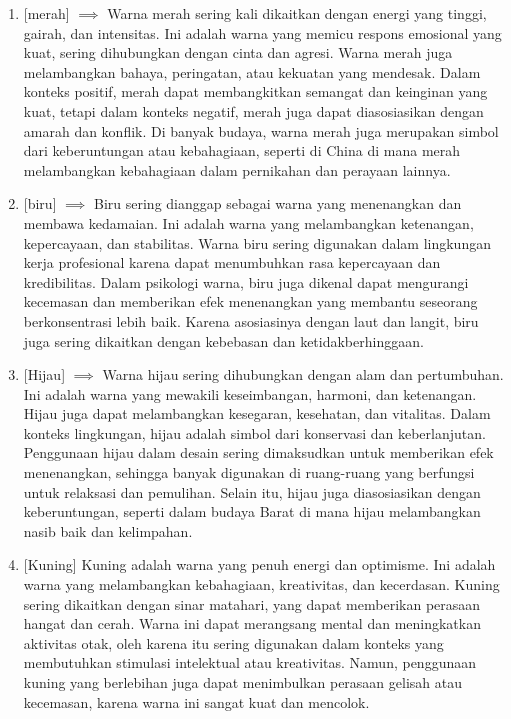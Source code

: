 \documentclass[a4paper]{article}
\begin{document}
\begin{enumerate}
  \item {}[merah] $\implies$ Warna merah sering kali dikaitkan dengan energi yang tinggi, gairah, dan intensitas. Ini adalah warna yang memicu respons emosional yang kuat, sering dihubungkan dengan cinta dan agresi. Warna merah juga melambangkan bahaya, peringatan, atau kekuatan yang mendesak. Dalam konteks positif, merah dapat membangkitkan semangat dan keinginan yang kuat, tetapi dalam konteks negatif, merah juga dapat diasosiasikan dengan amarah dan konflik. Di banyak budaya, warna merah juga merupakan simbol dari keberuntungan atau kebahagiaan, seperti di China di mana merah melambangkan kebahagiaan dalam pernikahan dan perayaan lainnya.
  \item {}[biru] $\implies$ Biru sering dianggap sebagai warna yang menenangkan dan membawa kedamaian. Ini adalah warna yang melambangkan ketenangan, kepercayaan, dan stabilitas. Warna biru sering digunakan dalam lingkungan kerja profesional karena dapat menumbuhkan rasa kepercayaan dan kredibilitas. Dalam psikologi warna, biru juga dikenal dapat mengurangi kecemasan dan memberikan efek menenangkan yang membantu seseorang berkonsentrasi lebih baik. Karena asosiasinya dengan laut dan langit, biru juga sering dikaitkan dengan kebebasan dan ketidakberhinggaan.
  \item {}[Hijau] $\implies$ Warna hijau sering dihubungkan dengan alam dan pertumbuhan. Ini adalah warna yang mewakili keseimbangan, harmoni, dan ketenangan. Hijau juga dapat melambangkan kesegaran, kesehatan, dan vitalitas. Dalam konteks lingkungan, hijau adalah simbol dari konservasi dan keberlanjutan. Penggunaan hijau dalam desain sering dimaksudkan untuk memberikan efek menenangkan, sehingga banyak digunakan di ruang-ruang yang berfungsi untuk relaksasi dan pemulihan. Selain itu, hijau juga diasosiasikan dengan keberuntungan, seperti dalam budaya Barat di mana hijau melambangkan nasib baik dan kelimpahan.
  \item {}[Kuning] Kuning adalah warna yang penuh energi dan optimisme. Ini adalah warna yang melambangkan kebahagiaan, kreativitas, dan kecerdasan. Kuning sering dikaitkan dengan sinar matahari, yang dapat memberikan perasaan hangat dan cerah. Warna ini dapat merangsang mental dan meningkatkan aktivitas otak, oleh karena itu sering digunakan dalam konteks yang membutuhkan stimulasi intelektual atau kreativitas. Namun, penggunaan kuning yang berlebihan juga dapat menimbulkan perasaan gelisah atau kecemasan, karena warna ini sangat kuat dan mencolok.

\end{enumerate}
\end{document}
